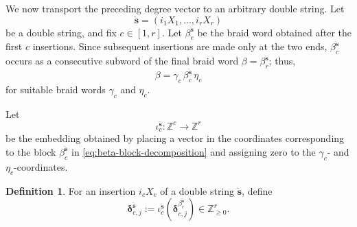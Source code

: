 \documentclass[12pt, reqno]{amsart}
\theoremstyle{plain}
\theoremstyle{definition}
\newtheorem{definition}[theorem]{Definition}
\numberwithin{equation}{section}
\newcommand{\ZZ}{\mathbb{Z}}
\begin{document}
We now transport the preceding degree vector to an arbitrary double
string. Let
\[
 \ddot{\mathbf s}
 =
 (i_1X_1,\ldots,i_rX_r)
\]
be a double string, and fix \(c\in[1,r]\).  Let
\(\beta_c^{\ddot{\mathbf s}}\) be the braid word
obtained after the first \(c\) insertions. Since subsequent insertions
are made only at the two ends, \(\beta_c^{\ddot{\mathbf s}}\) occurs
as a consecutive subword of the final braid word
\(\beta=\beta_r^{\ddot{\mathbf s}}\); thus,
\begin{equation}
 \beta
 =
 \gamma_c\,
 \beta_c^{\ddot{\mathbf s}}\,
 \eta_c
 \label{eq:beta-block-decomposition}
\end{equation}
for suitable braid words \(\gamma_c\) and \(\eta_c\).

Let
\[
 \iota_c^{\ddot{\mathbf s}}
 \colon
 \ZZ^c\longrightarrow\ZZ^r
\]
be the embedding obtained by placing a vector in the coordinates
corresponding to the block \(\beta_c^{\ddot{\mathbf s}}\) in
\eqref{eq:beta-block-decomposition} and assigning zero to the
\(\gamma_c\)- and \(\eta_c\)-coordinates.

\begin{definition}
\label{def:delta-double-string}
For an insertion \(i_cX_c\) of a double string $\ddot{\mathbf{s}}$, define
\begin{equation}
 \boldsymbol\delta_{c,j}^{\ddot{\mathbf s}}
 :=
 \iota_c^{\ddot{\mathbf s}}
 \left(
 \boldsymbol\delta_{c,j}^{\beta_c^{\ddot{\mathbf s}}}
 \right)
 \in\ZZ_{\geq0}^r.
 \label{eq:delta-double-string}
\end{equation}
\end{definition}
\end{document}
